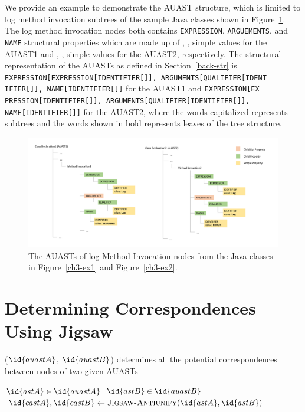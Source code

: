 We provide an example to demonstrate the AUAST structure, which is limited to log method invocation subtrees of the sample Java classes shown in Figure~\ref{fig:constructAUast}. The log method invocation nodes both contains \texttt{EXPRESSION}, \texttt{ARGUEMENTS}, and \texttt{NAME} structural properties which are made up of \texttt{}, \texttt{}, \texttt{} simple values for the AUAST1 and  \texttt{}, \texttt{}, \texttt{} simple values for the AUAST2, respectively. The structural representation of the AUASTs as defined in Section~\ref{back-str} is \texttt{EXPRESSION[EXPRESSION[IDENTIFIER[]], ARGUMENTS[QUALIFIER[IDENT\\IFIER[]], NAME[IDENTIFIER[]]}
for the AUAST1 and \texttt{EXPRESSION[EX\\PRESSION[IDENTIFIER[]], ARGUMENTS[QUALIFIER[IDENTIFIER[]], \\NAME[IDENTIFIER[]]}
for the AUAST2, where the words capitalized represents subtrees and the words shown in bold represents leaves of the tree structure.


\begin{figure} [H]
  \centering\includegraphics [width = \textwidth, height = 0.4\textheight]
  {Drawing4/structure1.pdf}
  \caption{The AUASTs of log Method Invocation nodes from the Java classes in Figure~\ref{ch3-ex1} and Figure~\ref{ch3-ex2}.}
  \label{fig:constructAUast}
\end{figure}


\section{Determining Correspondences Using Jigsaw} \label{meth-CAST}

\begin{algorithm}
\caption{($\id{auastA}$, $\id{auastB}$) determines all the potential correspondences between nodes of two given AUASTs}
\label{overview}
\begin{algorithmic}[1]
\JigsawCorr
\For $\id{astA} \in  \id{auastA}$
\For $\id{astB} \in  \id{auastB}$		
	\State  $\id{castA},\id{castB} \gets \func{Jigsaw-Antiunify}(\id{astA},\id{astB})$
\EndFor	
\EndFor
\end{algorithmic}
\end{algorithm}




